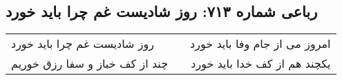 \begin{center}
\section*{رباعی شماره ۷۱۳: روز شادیست غم چرا باید خورد}
\label{sec:0713}
\begin{longtable}{l p{0.5cm} r}
روز شادیست غم چرا باید خورد
&&
امروز می از جام وفا باید خورد
\\
چند از کف خباز و سفا رزق خوریم
&&
یکچند هم از کف خدا باید خورد
\\
\end{longtable}
\end{center}
